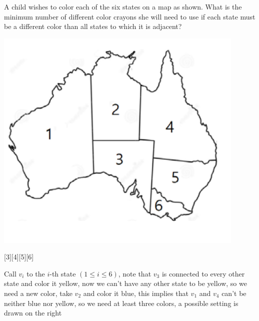 \documentclass[12pt]{article}
\newcounter{problem}
\begin{document}
\begin{problem}
   \begin{minipage}[b][][b]{0.75\linewidth}\vspace{0pt}%
      A child wishes to color each of the six states on a map as shown. What is the minimum number of different color crayons she will need to use if each state must be a different color than all states to which it is adjacent?    
      \end{minipage}\hfill%
      \begin{minipage}[b][][b]{0.2\linewidth}%
        \includegraphics[width=0.9\textwidth]{map.png}
      \vspace{4.5mm}
      \end{minipage}\vspace{-5mm}
      [3][4][5][6]
\end{problem}

\begin{solution}[B]
   Call $v_i$ to the $i$-th state $(1\leq i \leq 6)$, note that $v_3$ is connected to every other state and color it yellow, now we can't have any other state to be yellow, so we need a new color, take $v_2$ and color it blue, this implies that $v_1$ and $v_4$ can't be neither blue nor yellow, so we need at least three colors, a possible setting is drawn on the right
\end{solution}
\end{document}
